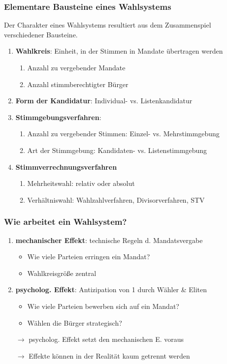 \documentclass{beamer}
\begin{document}
\begin{frame}
\frametitle{Elementare Bausteine eines Wahlsystems}

Der Charakter eines Wahlsystems resultiert aus dem Zusammenspiel verschiedener Bausteine.

\begin{enumerate}
  \item \textbf{Wahlkreis}: Einheit, in der Stimmen in Mandate übertragen werden
  \begin{enumerate}
    \item Anzahl zu vergebender Mandate
    \item Anzahl stimmberechtigter Bürger
  \end{enumerate}
  \item \textbf{Form der Kandidatur}: Individual- vs. Listenkandidatur
  \item \textbf{Stimmgebungsverfahren}:
  \begin{enumerate}
    \item Anzahl zu vergebender Stimmen: Einzel- vs. Mehrstimmgebung
    \item Art der Stimmgebung: Kandidaten- vs. Listenstimmgebung
  \end{enumerate}
  \item \textbf{Stimmverrechnungsverfahren}
  \begin{enumerate}
    \item Mehrheitswahl: relativ oder absolut
    \item Verhältniswahl: Wahlzahlverfahren, Divisorverfahren, STV
  \end{enumerate}
\end{enumerate}
\end{frame}

\begin{frame}
  \frametitle{Wie arbeitet ein Wahlsystem?}
  \begin{enumerate}
    \item \textbf{mechanischer Effekt}: technische Regeln d. Mandatsvergabe
    \begin{itemize}
      \item Wie viele Parteien erringen ein Mandat?
      \item Wahlkreisgröße zentral
    \end{itemize}
    \item \textbf{psycholog. Effekt}: Antizipation von 1 durch Wähler \& Eliten
    \begin{itemize}
      \item Wie viele Parteien bewerben sich auf ein Mandat?
      \item Wählen die Bürger strategisch?
    \end{itemize}
  \item [$\rightarrow$] psycholog. Effekt setzt den mechanischen E. voraus
  \item [$\rightarrow$] Effekte können in der Realität kaum getrennt werden
  \end{enumerate}
\end{frame}
\end{document}
